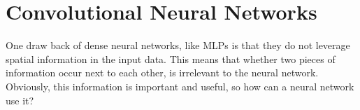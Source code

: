 %
%
%
%
%
%
%
%
%    
%
%

\section{Convolutional Neural Networks}
One draw back of dense neural networks, like \ac{MLP}s is that they do not leverage spatial information in the input data. This means that whether two pieces of information occur next to each other, is irrelevant to the neural network. Obviously, this information is important and useful, so how can a neural network use it?

